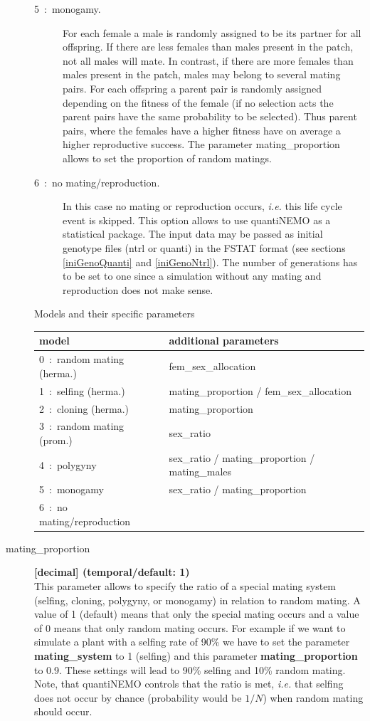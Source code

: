 \documentclass[letterpaper,12pt,oneside]{book}
\begin{document}
\begin{description}
\begin{description}
\item [5~:~monogamy.] For each female a male is randomly assigned to be its partner for all offspring. If there are less females than males present in the patch, not all males will mate. In contrast, if there are more females than males present in the patch, males may belong to several mating pairs. For each offspring a parent pair is randomly assigned depending on the fitness of the female (if no selection acts the parent pairs have the same probability to be selected). Thus parent pairs, where the females have a higher fitness have on average a higher reproductive success. The parameter \textsf{mating\_proportion} allows to set the proportion of random matings.

\item [6~:~no mating/reproduction.] In this case no mating or reproduction occurs, \textit{i.e.} this life cycle event is skipped. This option allows to use quantiNEMO as a statistical package. The input data may be passed as initial genotype files (ntrl or quanti) in the FSTAT format (see sections \ref{iniGenoQuanti} and \ref{iniGenoNtrl}). The number of generations has to be set to one since a simulation without any mating and reproduction does not make sense.

\end{description}

Models and their specific parameters\\
\begin{tabular*}{0.92\textwidth}{ll}
 \hline model & additional parameters \\ 
 \hline
 0~:~random mating (herma.)& fem\_sex\_allocation\\
 1~:~selfing (herma.)      & mating\_proportion / fem\_sex\_allocation\\
 2~:~cloning (herma.)      & mating\_proportion\\
 3~:~random mating (prom.) & sex\_ratio\\
 4~:~polygyny              & sex\_ratio / mating\_proportion / mating\_males\\
 5~:~monogamy              & sex\_ratio / mating\_proportion\\
 6~:~no mating/reproduction & \\
 \hline
\end{tabular*}

\item[mating\_proportion\index{mating\_proportion}] \textbf{[decimal] (temporal/default: 1)}\\
This parameter allows to specify the ratio of a special mating system (selfing, cloning, polygyny, or monogamy) in relation to random mating. A value of 1 (default) means that only the special mating occurs and a value of 0 means that only random mating occurs. For example if we want to simulate a plant with a selfing rate of 90\% we have to set the parameter \textbf{mating\_system} to 1 (selfing) and this parameter \textbf{mating\_proportion} to 0.9. These settings will lead to 90\% selfing and 10\% random mating. Note, that quantiNEMO controls that the ratio is met, \textit{i.e.} that selfing does not occur by chance (probability would be $1/N$) when random mating should occur.


\end{description}
\end{document}
